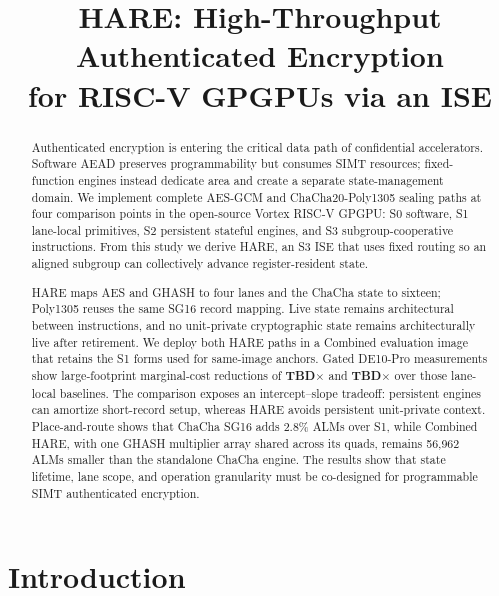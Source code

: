 \documentclass[conference]{IEEEtran}
\newcommand{\AESBoardSpeedup}{\textbf{TBD}\ensuremath{\times}}
\newcommand{\ChaChaBoardSpeedup}{\textbf{TBD}\ensuremath{\times}}
\begin{document}
\title{HARE: High-Throughput Authenticated Encryption\\
for RISC-V GPGPUs via an ISE}

\author{
}

\maketitle

\begin{abstract}
Authenticated encryption is entering the critical data path of confidential
accelerators. Software AEAD preserves programmability but consumes SIMT
resources; fixed-function engines instead dedicate area and create a separate
state-management domain. We implement complete AES-GCM and
ChaCha20-Poly1305 sealing paths at four comparison points in the open-source
Vortex RISC-V GPGPU: S0 software, S1 lane-local primitives, S2 persistent
stateful engines, and S3 subgroup-cooperative instructions. From this study we
derive HARE, an S3 ISE that uses fixed routing so an aligned subgroup can
collectively advance register-resident state.

HARE maps AES and GHASH to four lanes and the ChaCha state to sixteen;
Poly1305 reuses the same SG16 record mapping. Live state remains architectural
between instructions, and no unit-private cryptographic state remains
architecturally live after retirement. We deploy both HARE paths in a Combined
evaluation image that retains the S1 forms used for same-image anchors.
Gated DE10-Pro measurements show large-footprint marginal-cost reductions of
\AESBoardSpeedup{} and \ChaChaBoardSpeedup{} over those lane-local baselines.
The comparison exposes an intercept--slope tradeoff: persistent engines can
amortize short-record setup, whereas HARE avoids persistent unit-private
context. Place-and-route shows that ChaCha SG16 adds 2.8\% ALMs over S1, while
Combined HARE, with one GHASH multiplier array shared across its quads,
remains 56{,}962 ALMs smaller than the standalone ChaCha engine.
The results show that state lifetime, lane scope, and operation granularity
must be co-designed for programmable SIMT authenticated encryption.
\end{abstract}

\section{Introduction}\label{sec:intro}
\end{document}
